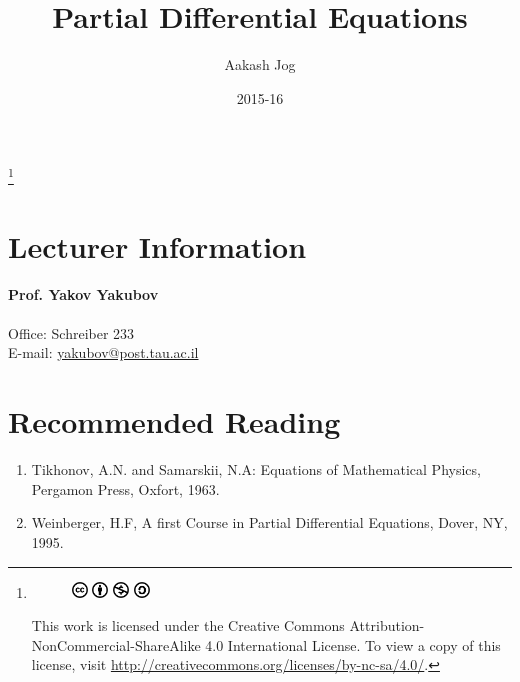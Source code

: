 \documentclass[titlepage, fleqn, a4paper, 12pt, twoside]{article}
\title{Partial Differential Equations}
\author{Aakash Jog}
\date{2015-16}
\theoremstyle{definition}
\theoremstyle{theorem}
\newcommand\blfootnote[1]{%
	\begingroup
	\renewcommand\thefootnote{}\footnote{#1}%
	\addtocounter{footnote}{-1}%
	\endgroup
}
\begin{document}
\begin{titlepage}
\maketitle
\end{titlepage}
\restoregeometry

\blfootnote
{	
	\begin{figure}[H]
		\includegraphics[height = 12pt]{cc.pdf}
		\includegraphics[height = 12pt]{by.pdf}
		\includegraphics[height = 12pt]{nc.pdf}
		\includegraphics[height = 12pt]{sa.pdf}
	\end{figure}
	This work is licensed under the Creative Commons Attribution-NonCommercial-ShareAlike 4.0 International License. To view a copy of this license, visit \url{http://creativecommons.org/licenses/by-nc-sa/4.0/}.
} %

\tableofcontents

\clearpage
\section{Lecturer Information}

\textbf{Prof. Yakov Yakubov}\\
~\\
Office: Schreiber 233\\
E-mail: \href{mailto:yakubov@post.tau.ac.il}{yakubov@post.tau.ac.il}\\

\section{Recommended Reading}

\begin{enumerate}
	\item Tikhonov, A.N. and Samarskii, N.A: Equations of Mathematical Physics, Pergamon Press, Oxfort, 1963.
	\item Weinberger, H.F, A first Course in Partial Differential Equations, Dover, NY, 1995.
\end{enumerate}
\end{document}
